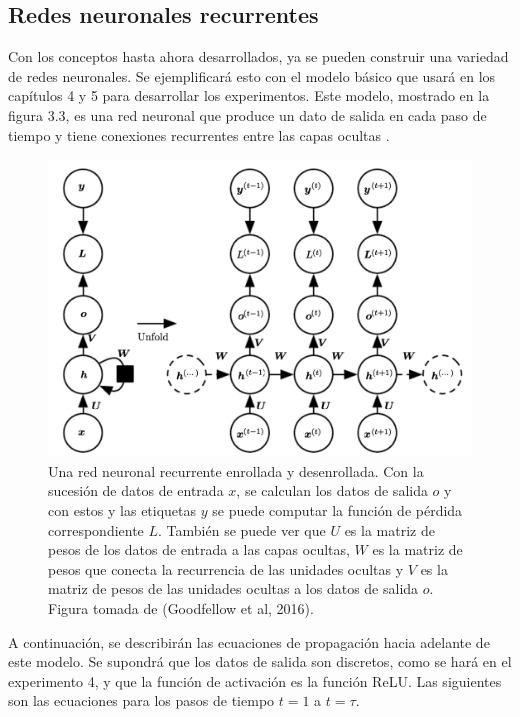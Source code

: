 \subsection{Redes neuronales recurrentes}
Con los conceptos hasta ahora desarrollados, ya se pueden construir una variedad de redes neuronales. Se ejemplificará esto con el modelo básico que usará en los capítulos 4 y 5 para desarrollar los experimentos. Este modelo, mostrado en la figura 3.3, es una red neuronal que produce un dato de salida en cada paso de tiempo y tiene conexiones recurrentes entre las capas ocultas \cite{goodfellow-et-al-2016} \cite{DBLP:journals/corr/Graves13}.

\begin{figure}[h]
\begin{center}
\includegraphics[width=150mm, scale = 0.8]{./imag/unfold3.png}
\end{center}
\caption{Una red neuronal recurrente enrollada y desenrollada. Con la sucesión de datos de entrada $x$, se calculan los datos de salida $o$ y con estos y las etiquetas $y$ se puede computar la función de pérdida correspondiente $L$. También se puede ver que $U$ es la matriz de pesos de los datos de entrada a las capas ocultas, $W$ es la matriz de pesos que conecta la recurrencia de las unidades ocultas y $V$ es la matriz de pesos de las unidades ocultas a los datos de salida $o$. Figura tomada de (Goodfellow et al, 2016).}
\end{figure}

\vspace{1em}

A continuación, se describirán las ecuaciones de propagación hacia adelante de este modelo. Se supondrá que los datos de salida son discretos, como se hará en el experimento 4, y que la función de activación es la función ReLU. Las siguientes son las ecuaciones para los pasos de tiempo $t=1$ a $t=\tau$.

